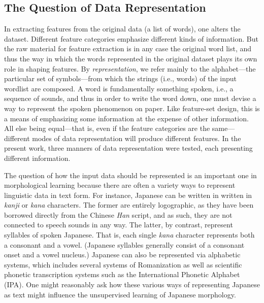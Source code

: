 \subsection{The Question of Data Representation} 
In extracting features from the original data (a list of words), one alters the dataset. Different feature categories emphasize different kinds of information. But the raw material for feature extraction is in any case the original word list, and thus the way in which the words represented in the original dataset plays its own role in shaping features. 
By \emph{representation}, we refer mainly to the alphabet---the
particular set of symbols---from which the strings (i.e., words) of the input wordlist 
are composed.  A word is fundamentally something spoken, i.e., a sequence of sounds, and thus in order to write the word down, one must devise a way to represent the spoken phenomenon on paper. Like feature-set design, this is a means of emphasizing some information at the expense of other information. All else being equal---that is, even if the feature categories are the same---different modes of data representation will produce different features.  
In the present work, three manners of data representation were tested, each presenting 
different information. 

The question of how the input data should be represented is an important one in morphological 
learning because there are often 
a variety ways to represent linguistic data in text form. 
For instance, Japanese can be written in written in \textit{kanji} or 
\textit{kana} characters. The former are entirely logographic, as they 
have been borrowed directly from the Chinese \textit{Han} script, 
and as such, they are not connected to speech sounds in any way. The latter, by contrast,
represent syllables of spoken Japanese. That is, each single \textit{kana} 
character represents both a consonant and a vowel.  (Japanese syllables generally consist of a consonant onset and a vowel nucleus.)  Japanese can also be represented via alphabetic systems, which includes several systems of Romanization as well as scientific phonetic transcription systems such as the International Phonetic Alphabet (IPA).  One might reasonably ask how these various ways of representing Japanese as text might influence the unsupervised learning of Japanese morphology.

